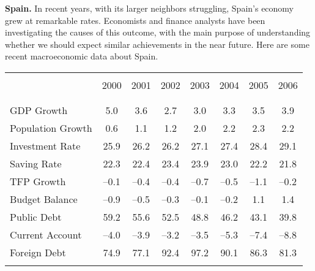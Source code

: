\documentclass[letterpaper,12pt]{exam}
\begin{document}
\begin{questions}
\question \textbf{Spain.} In recent years, with its larger neighbors
struggling, Spain's economy grew at remarkable rates. Economists and
finance analysts have been investigating the causes of this outcome,
with the main purpose of understanding whether we should expect
similar achievements in the near future. Here are some recent
macroeconomic data about Spain.

\begin{table}[h]
\vspace{1em}%
\centering%
\hspace{-3cm}%
\begin{minipage}
{0.52\textwidth}%
\begin{center}{\small
\begin{tabular}{lccccccc}%
\vspace{-0.6cm}\\
\hline%
\vspace{-.3cm}\\
                     & 2000  &  2001  &  2002   & 2003  & 2004 &  2005  &  2006 \\%
\vspace{-.3cm}\\
\hline%
\vspace{-.2cm}\\
GDP Growth           &  5.0   &   3.6  &   2.7   &  3.0  &  3.3  &   3.5  &  3.9 \\%
Population Growth    &  0.6   &   1.1  &    1.2  &  2.0  &  2.2  &   2.3  &  2.2 \\
Investment Rate      &  25.9  &   26.2 &   26.2  &  27.1 &  27.4 &   28.4 &  29.1\\%
Saving Rate          &  22.3  &   22.4 &   23.4  &  23.9 &  23.0 &   22.2 &  21.8\\%
TFP Growth           &  --0.1 &  --0.4 &   --0.4 &  --0.7&  --0.5&   --1.1&  --0.2\\%
Budget Balance       &  --0.9 &  --0.5 &   --0.3 &  --0.1&  --0.2&    1.1 &  1.4 \\%
Public Debt          &  59.2  &  55.6  &   52.5  &  48.8 &  46.2 &   43.1 &  39.8\\%
Current Account      &  --4.0 &  --3.9 &   --3.2 &  --3.5&  --5.3&   --7.4&  --8.8\\%
Foreign Debt         &  74.9  &  77.1  &   92.4  &  97.2 &  90.1 &   86.3 &  81.3 \\%
\hline%
\vspace{-3mm}\\
\end{tabular}
}
\end{center}
\end{minipage}
\end{table}


\end{questions}
\end{document}
